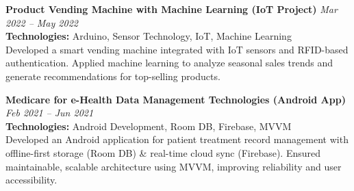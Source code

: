 \vspace{1em}

\textcolor[RGB]{0,128,128}{\textbf{Product Vending Machine with Machine Learning (IoT Project)}} \hfill \textit{Mar 2022 – May 2022} \\
\textbf{Technologies:} Arduino, Sensor Technology, IoT, Machine Learning \\
Developed a smart vending machine integrated with IoT sensors and RFID-based authentication. Applied machine learning to analyze seasonal sales trends and generate recommendations for top-selling products.

\vspace{1em}

\textcolor[RGB]{0,128,128}{\textbf{Medicare for e-Health Data Management Technologies (Android App)}} \hfill \textit{Feb 2021 – Jun 2021} \\
\textbf{Technologies:} Android Development, Room DB, Firebase, MVVM \\
Developed an Android application for patient treatment record management with offline-first storage (Room DB) \& real-time cloud sync (Firebase). Ensured maintainable, scalable architecture using MVVM, improving reliability and user accessibility.